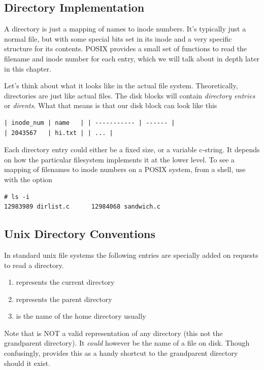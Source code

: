\subsection{Directory Implementation}

A directory is just a mapping of names to inode numbers. It's typically just a normal file, but with some special bits set in its inode and a very specific structure for its contents. POSIX provides a small set of functions to read the filename and inode number for each entry, which we will talk about in depth later in this chapter.

Let's think about what it looks like in the actual file system. Theoretically, directories are just like actual files. The disk blocks will contain \emph{directory entries} or \emph{dirents}. What that means is that our disk block can look like this

\begin{verbatim}
| inode_num | name   | | ----------- | ------ |
| 2043567   | hi.txt | | ... |
\end{verbatim}

Each directory entry could either be a fixed size, or a variable c-string. It depends on how the particular filesystem implements it at the lower level. To see a mapping of filenames to inode numbers on a POSIX system, from a shell, use  with the  option

\begin{verbatim}
# ls -i
12983989 dirlist.c      12984068 sandwich.c
\end{verbatim}

\subsection{Unix Directory Conventions}

In standard unix file systems the following entries are specially added on requests to read a directory.

\begin{enumerate}
  \item {} represents the current directory
  \item {} represents the parent directory
  \item \keyword{~~} is the name of the home directory usually
\end{enumerate}

Note that  is NOT a valid representation of any directory (this not the grandparent directory). It \emph{could} however be the name of a file on disk. Though confusingly,  provides this as a handy shortcut to the grandparent directory should it exist.

